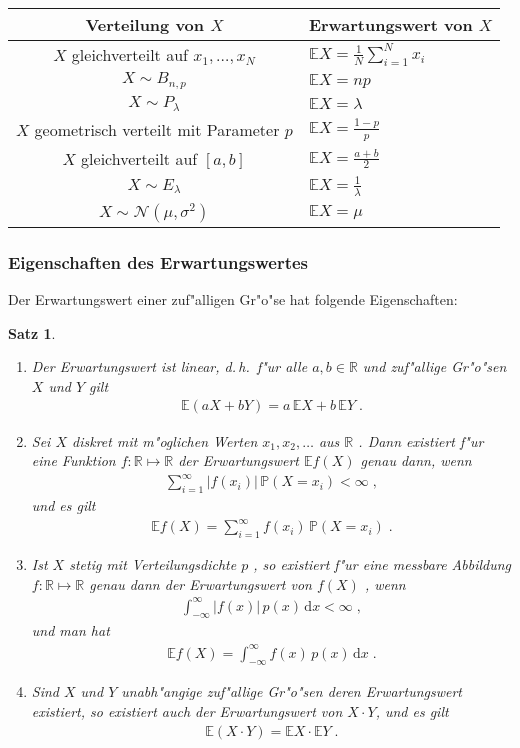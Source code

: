 \documentclass[ngerman,draft,parskip=half,twoside]{scrartcl}
\newtheorem{thm}{Satz}[section]
\newcommand*{\R}{\mathbb{R}}      %
\newcommand*{\E}{\mathbb{E}}        %
\newcommand*{\WKM}{\mathbb{P}}      %
\begin{document}
{\renewcommand{\arraystretch}{1.4}
\begin{center}
\begin{tabular}{|c|l|}\hline
\bf Verteilung von $X$& \bf Erwartungswert von $X$\\ \hline\hline
$X$ gleichverteilt auf $x_1,\ldots,x_N$& $\E X=\frac{1}{N}\sum_{i=1}^N x_i$\\ \hline
$X\sim B_{n,p}$& $\E X= n p$\\ \hline
$X\sim P_\lambda$&$\E X= \lambda$\\ \hline
$X$ geometrisch verteilt mit Parameter $p$& $\E X = \frac{1-p}{p}$\\ \hline
$X$ gleichverteilt auf $[a,b]$& $\E X= \frac{a+b}{2}$\\ \hline
$X\sim E_\lambda$& $\E X = \frac{1}{\lambda}$\\ \hline
$X\sim \mathcal N(\mu,\sigma^2)$&$ \E X = \mu$\\ \hline
\end{tabular}
\end{center}
}
\subsubsection{Eigenschaften des Erwartungswertes}
Der Erwartungswert einer zuf"alligen Gr"o"se hat folgende Eigenschaften:
\begin{thm}~
\begin{enumerate}
\item
Der Erwartungswert ist linear, d.\,h.~f"ur alle $a,b\in\R$ und zuf"allige Gr"o"sen $X$ und $Y$
gilt
  \begin{gather*}
    \E(a X+ b Y) = a\,\E X + b\, \E Y\;.
  \end{gather*}
\item
Sei  $X$ diskret mit m"oglichen Werten $x_1,x_2,\ldots$ aus $\R$ .
Dann existiert f"ur eine Funktion $f \colon\R\mapsto\R$
der Erwartungswert $\E f(X)$ genau dann, wenn
  \begin{gather*}
    \sum_{i=1}^\infty |f(x_i)|\,\WKM(X=x_i)<\infty\;,
  \end{gather*}
und es gilt
  \begin{gather*}
    \E f(X)=\sum_{i=1}^\infty f(x_i)\,\WKM(X=x_i)\;.
  \end{gather*}
\item
Ist $X$ stetig mit Verteilungsdichte $p$ , so existiert f"ur eine messbare
Abbildung $f \colon\R\mapsto\R$ genau dann der Erwartungswert von $f(X)$ , wenn
  \begin{gather*}
    \int_{-\infty}^\infty |f(x)|\,p(x)\,\mathrm d x<\infty\;,
  \end{gather*}
und man hat
  \begin{gather*}
    \E f(X)=\int_{-\infty}^\infty  f(x) \,p(x)\,\mathrm d x\;.
  \end{gather*}
\item
Sind $X$ und $Y$ unabh"angige zuf"allige Gr"o"sen deren Erwartungswert existiert,
so existiert auch der Erwartungswert von $X\cdot Y$, und es gilt
  \begin{gather*}
    \E(X\cdot Y)= \E X \cdot \E Y\;.
  \end{gather*}
\end{enumerate}
\end{thm}
\end{document}
